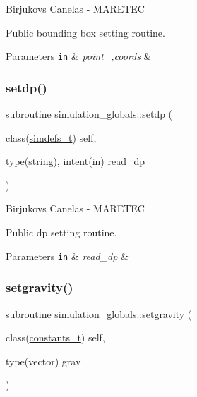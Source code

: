 Birjukovs Canelas -\/ M\+A\+R\+E\+T\+EC 

Public bounding box setting routine. 
\begin{DoxyParams}[1]{Parameters}
\mbox{\tt in}  & {\em point\+\_\+,coords} & \\
\hline
\end{DoxyParams}
\mbox{\label{namespacesimulation__globals_a9a8e88c06937b7cf6be9d9bf30f54ba9}} 
\subsubsection{\texorpdfstring{setdp()}{setdp()}}
{\footnotesize\ttfamily subroutine simulation\+\_\+globals\+::setdp (\begin{DoxyParamCaption}\item[{class(\mbox{\hyperlink{structsimulation__globals_1_1simdefs__t}{simdefs\+\_\+t}})}]{self,  }\item[{type(string), intent(in)}]{read\+\_\+dp }\end{DoxyParamCaption})\hspace{0.3cm}{\ttfamily [private]}}



Birjukovs Canelas -\/ M\+A\+R\+E\+T\+EC 

Public dp setting routine. 
\begin{DoxyParams}[1]{Parameters}
\mbox{\tt in}  & {\em read\+\_\+dp} & \\
\hline
\end{DoxyParams}
\mbox{\label{namespacesimulation__globals_ac655f60155581a71b312f3c1a8c87db2}} 
\subsubsection{\texorpdfstring{setgravity()}{setgravity()}}
{\footnotesize\ttfamily subroutine simulation\+\_\+globals\+::setgravity (\begin{DoxyParamCaption}\item[{class(\mbox{\hyperlink{structsimulation__globals_1_1constants__t}{constants\+\_\+t}})}]{self,  }\item[{type(vector)}]{grav }\end{DoxyParamCaption})\hspace{0.3cm}{\ttfamily [private]}}



